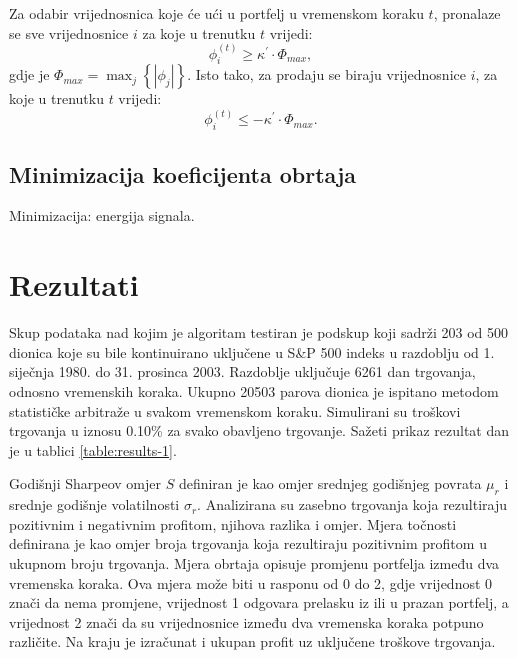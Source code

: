 \documentclass[lmodern, utf8, diplomski, numeric]{fer}
\newcommand{\q}{\left}
\newcommand{\w}{\right}
\begin{document}
  Za odabir vrijednosnica koje će ući u portfelj u vremenskom koraku $t$, pronalaze se sve vrijednosnice $i$ za koje u trenutku $t$ vrijedi:
  \begin{equation*}
  \phi_i^{\q(t\w)} \ge \kappa^\prime \cdot \Phi_\mathit{max},
  \end{equation*}
  gdje je $\Phi_\mathit{max} = \max_j \q\{ \q\lvert \phi_j \w\rvert \w\}$.
  Isto tako, za prodaju se biraju vrijednosnice $i$, za koje u trenutku $t$ vrijedi:
  \begin{equation*}
  \phi_i^{\q(t\w)} \le -\kappa^\prime \cdot \Phi_\mathit{max}.
  \end{equation*}
  
  \section{Minimizacija koeficijenta obrtaja} 
  Minimizacija: energija signala.
  
  \chapter{Rezultati}
  Skup podataka nad kojim je algoritam testiran je podskup koji sadrži 203 od 500 dionica koje su bile kontinuirano uključene u S\&P 500 indeks u razdoblju od 1. siječnja 1980. do 31. prosinca 2003.
  Razdoblje uključuje 6261 dan trgovanja, odnosno vremenskih koraka.
  Ukupno 20503 parova dionica je ispitano metodom statističke arbitraže u svakom vremenskom koraku.
  Simulirani su troškovi trgovanja u iznosu 0.10\% za svako obavljeno trgovanje.
  Sažeti prikaz rezultat dan je u tablici \ref{table:results-1}.
  
  Godišnji Sharpeov omjer $S$ definiran je kao omjer srednjeg godišnjeg povrata $\mu_r$ i srednje godišnje volatilnosti $\sigma_r$.
  Analizirana su zasebno trgovanja koja rezultiraju pozitivnim i negativnim profitom, njihova razlika i omjer.
  Mjera točnosti definirana je kao omjer broja trgovanja koja rezultiraju pozitivnim profitom u ukupnom broju trgovanja.
  Mjera obrtaja  opisuje promjenu portfelja između dva vremenska koraka.
  Ova mjera može biti u rasponu od 0 do 2, gdje vrijednost 0 znači da nema promjene, vrijednost 1 odgovara prelasku iz ili u prazan portfelj, a vrijednost 2 znači da su vrijednosnice između dva vremenska koraka potpuno različite.
  Na kraju je izračunat i ukupan profit uz uključene troškove trgovanja.
  
\end{document}
